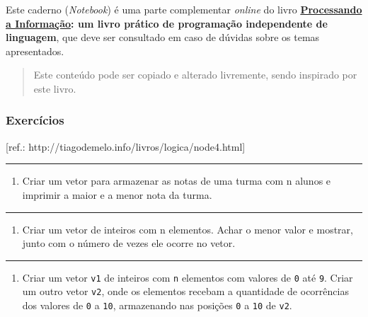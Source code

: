 \documentclass[12pt,a4paper]{article}
\renewcommand{\linethickness}{0.05em}
\providecommand{\tightlist}{%
      \setlength{\itemsep}{0pt}\setlength{\parskip}{0pt}}
\begin{document}
Este caderno (\emph{Notebook}) é uma parte complementar \emph{online} do
livro
\textbf{\href{https://editora.ufabc.edu.br/matematica-e-ciencias-da-computacao/58-processando-a-informacao}{Processando
a Informação}: um livro prático de programação independente de
linguagem}, que deve ser consultado em caso de dúvidas sobre os temas
apresentados.

\begin{quote}
Este conteúdo pode ser copiado e alterado livremente, sendo inspirado
por este livro.
\end{quote}

    \hypertarget{exercuxedcios}{%
\subsubsection{Exercícios}\label{exercuxedcios}}

{[}ref.: http://tiagodemelo.info/livros/logica/node4.html{]}

    \begin{center}\rule{0.5\linewidth}{\linethickness}\end{center}

\begin{enumerate}
\def\labelenumi{\arabic{enumi}.}
\tightlist
\item
  Criar um vetor para armazenar as notas de uma turma com n alunos e
  imprimir a maior e a menor nota da turma.
\end{enumerate}

    \begin{center}\rule{0.5\linewidth}{\linethickness}\end{center}

\begin{enumerate}
\def\labelenumi{\arabic{enumi}.}
\setcounter{enumi}{1}
\tightlist
\item
  Criar um vetor de inteiros com n elementos. Achar o menor valor e
  mostrar, junto com o número de vezes ele ocorre no vetor.
\end{enumerate}

    \begin{center}\rule{0.5\linewidth}{\linethickness}\end{center}

\begin{enumerate}
\def\labelenumi{\arabic{enumi}.}
\setcounter{enumi}{2}
\tightlist
\item
  Criar um vetor \texttt{v1} de inteiros com \texttt{n} elementos com
  valores de \texttt{0} até \texttt{9}. Criar um outro vetor
  \texttt{v2}, onde os elementos recebam a quantidade de ocorrências dos
  valores de \texttt{0} a \texttt{10}, armazenando nas posições
  \texttt{0} a \texttt{10} de \texttt{v2}.
\end{enumerate}
\end{document}
